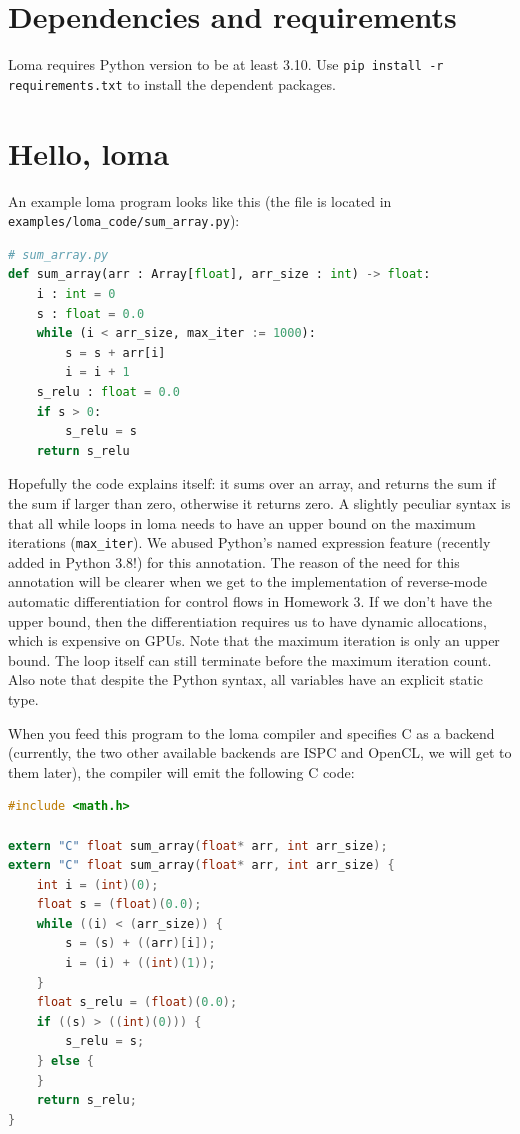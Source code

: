 \section{Dependencies and requirements}

Loma requires Python version to be at least 3.10. 
Use \lstinline{pip install -r requirements.txt} to install the dependent packages.

\section{Hello, loma}

An example loma program looks like this (the file is located in \lstinline{examples/loma_code/sum_array.py}):
\begin{lstlisting}[language=python]
# sum_array.py
def sum_array(arr : Array[float], arr_size : int) -> float:
    i : int = 0
    s : float = 0.0
    while (i < arr_size, max_iter := 1000):
        s = s + arr[i]
        i = i + 1
    s_relu : float = 0.0
    if s > 0:
        s_relu = s
    return s_relu
\end{lstlisting}
Hopefully the code explains itself: it sums over an array, and returns the sum if the sum if larger than zero, otherwise it returns zero. A slightly peculiar syntax is that all while loops in loma needs to have an upper bound on the maximum iterations (\lstinline{max_iter}). We abused Python's named expression feature (recently added in Python 3.8!) for this annotation. The reason of the need for this annotation will be clearer when we get to the implementation of reverse-mode automatic differentiation for control flows in Homework 3. If we don't have the upper bound, then the differentiation requires us to have dynamic allocations, which is expensive on GPUs. Note that the maximum iteration is only an upper bound. The loop itself can still terminate before the maximum iteration count. Also note that despite the Python syntax, all variables have an explicit static type.

When you feed this program to the loma compiler and specifies C as a backend (currently, the two other available backends are ISPC and OpenCL, we will get to them later), the compiler will emit the following C code:
\begin{lstlisting}[language=c]
#include <math.h>
        
extern "C" float sum_array(float* arr, int arr_size);
extern "C" float sum_array(float* arr, int arr_size) {
    int i = (int)(0);
    float s = (float)(0.0);
    while ((i) < (arr_size)) {
        s = (s) + ((arr)[i]);
        i = (i) + ((int)(1));
    }
    float s_relu = (float)(0.0);
    if ((s) > ((int)(0))) {
        s_relu = s;
    } else {
    }
    return s_relu;
}
\end{lstlisting}


